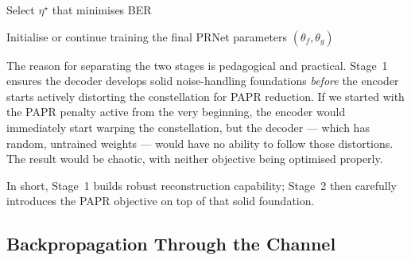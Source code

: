 \begin{algorithm}[H]
    \DontPrintSemicolon
    \SetAlgoLined
    \BlankLine
    Select $\eta^\star$ that minimises BER\;

    \BlankLine
    Initialise or continue training the final PRNet parameters
        $(\theta_f,\theta_g)$\;
    \caption{Two-stage PRNet training procedure (Kim et al.,
             2017~\cite{kim2017novel}).}
    \label{alg:prnet_training}
\end{algorithm}

The reason for separating the two stages is pedagogical and practical.
Stage~1 ensures the decoder develops solid noise-handling foundations
\emph{before} the encoder starts actively distorting the constellation
for PAPR reduction.  If we started with the PAPR penalty active from
the very beginning, the encoder would immediately start warping the
constellation, but the decoder --- which has random, untrained weights ---
would have no ability to follow those distortions.  The result would be
chaotic, with neither objective being optimised properly.

In short, Stage~1 builds robust reconstruction capability; Stage~2 then
carefully introduces the PAPR objective on top of that solid foundation.


\subsection{Backpropagation Through the Channel}

